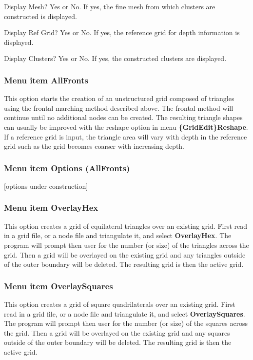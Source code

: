 \documentclass{article}
\begin{document}
\begin{description}
 \item Display Mesh? Yes or No. If yes, the fine mesh from which clusters are constructed is displayed.
 \item Display Ref Grid? Yes or No. If yes, the reference grid for depth information is displayed.
 \item Display Clusters? Yes or No. If yes, the constructed clusters are displayed.
\end{description}

\subsubsection[Menu item AllFronts]{Menu item AllFronts}
This option starts the creation of an unstructured grid composed of triangles using the frontal marching method described above. The frontal method will continue until no additional nodes can be created. The resulting triangle shapes can usually be improved with the reshape option in menu {\bf \{GridEdit\}Reshape}.
If a reference grid is input, the triangle area will vary with depth in the reference grid such as the grid becomes coarser with increasing depth.  

\subsubsection[Menu item Options (AllFronts)]{Menu item Options (AllFronts)}
[options under construction]

\subsubsection[Menu item OverlayHex]{Menu item OverlayHex}
This option creates a grid of equilateral triangles over an existing grid. First read in a grid file, or a node file and triangulate it, and select {\bf OverlayHex}. The program will prompt then user for the number (or size) of the triangles across the grid. Then a grid will be overlayed on the existing grid and any triangles outside of the outer boundary will be deleted. The resulting grid is then the active grid.


\subsubsection[Menu item OverlaySquares]{Menu item OverlaySquares}
This option creates a grid of square quadrilaterals over an existing grid. First read in a grid file, or a node file and triangulate it, and select {\bf OverlaySquares}. The program will prompt then user for the number (or size) of the squares across the grid. Then a grid will be overlayed on the existing grid and any squares outside of the outer boundary will be deleted. The resulting grid is then the active grid.
\end{document}

